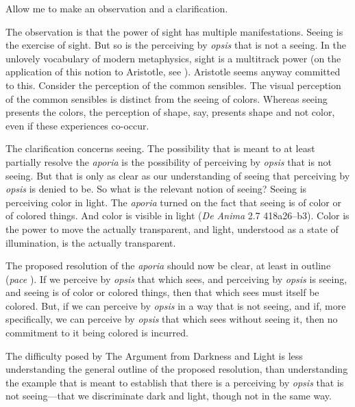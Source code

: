 Allow me to make an observation and a clarification.

The observation is that the power of sight has multiple manifestations. Seeing is the exercise of sight. But so is the perceiving by \emph{opsis} that is not a seeing. In the unlovely vocabulary of modern metaphysics, sight is a multitrack power (on the application of this notion to Aristotle, see \citealt[3.1.2]{Marmodoro:2014br}). Aristotle seems anyway committed to this. Consider the perception of the common sensibles. The visual perception of the common sensibles is distinct from the seeing of colors. Whereas seeing presents the colors, the perception of shape, say, presents shape and not color, even if these experiences co-occur.

The clarification concerns seeing. The possibility that is meant to at least partially resolve the \emph{aporia} is the possibility of perceiving by \emph{opsis} that is not seeing. But that is only as clear as our understanding of seeing that perceiving by \emph{opsis} is denied to be. So what is the relevant notion of seeing? Seeing is perceiving color in light. The \emph{aporia} turned on the fact that seeing is of color or of colored things. And color is visible in light (\emph{De Anima} 2.7 418a26–b3). Color is the power to move the actually transparent, and light, understood as a state of illumination, is the actually transparent.


The proposed resolution of the \emph{aporia} should now be clear, at least in outline (\emph{pace} \citealt[122]{Hamlyn:2002ys}). If we perceive by \emph{opsis} that which sees, and perceiving by \emph{opsis} is seeing, and seeing is of color or colored things, then that which sees must itself be colored. But, if we can perceive by \emph{opsis} in a way that is not seeing, and if, more specifically, we can perceive by \emph{opsis} that which sees without seeing it, then no commitment to it being colored is incurred.

The difficulty posed by The Argument from Darkness and Light is less understanding the general outline of the proposed resolution, than understanding the example that is meant to establish that there is a perceiving by \emph{opsis} that is not seeing—that we discriminate dark and light, though not in the same way.

